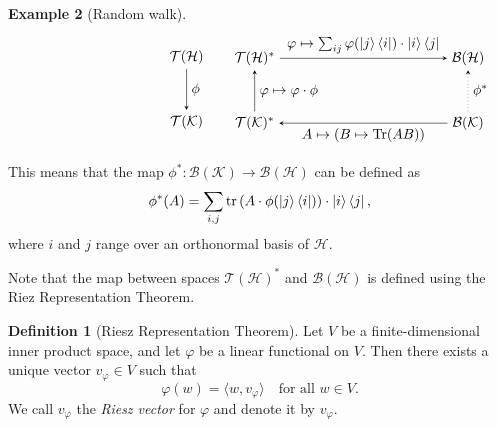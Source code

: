 \documentclass[10pt,a4paper]{amsart}
\theoremstyle{definition}
\newtheorem{definition}{Definition}[section]
\theoremstyle{definition}
\newtheorem{example}[definition]{Example}
\theoremstyle{definition}
\theoremstyle{definition}
\theoremstyle{definition}
\theoremstyle{definition}
\begin{document}
\begin{example}[Random walk]
\[
\begin{minipage}{0.45\textwidth}
\centering
\begin{tikzpicture}
  \matrix (m) [matrix of math nodes,row sep=3em,column sep=2em,minimum width=1em]
  { 
    \mathcal{T}(\mathcal{H}) \\
     \mathcal{T}(\mathcal{K})  \\
  };
  \path[-stealth]
    (m-1-1) edge  node [right] {$\phi$} (m-2-1);
\end{tikzpicture}
\end{minipage}
\hspace{-50pt}
\begin{minipage}{0.45\textwidth}
\centering
\begin{tikzpicture}
  \matrix (m) [matrix of math nodes,row sep=3em,column sep=12em,minimum width=1em]
  {
  \mathcal{T}(\mathcal{H})^*&  \mathcal{B}(\mathcal{H})  \\
   \mathcal{T}(\mathcal{K})^* &  \mathcal{B}(\mathcal{K}) \\
  };
  \path[-stealth]
    (m-1-1) edge  node [above] {$\varphi \mapsto \sum_{ij} \varphi(\ket{j}\bra{i}) \cdot \ket{i} \bra{j}  $} (m-1-2)
    (m-2-2) edge [dotted]  node [right] {$\phi^*$} (m-1-2)
    (m-2-2) edge  node [below] {$ A \mapsto (B \mapsto \tr(AB)) $} (m-2-1)
    (m-2-1) edge  node [right] {$ \varphi \mapsto \varphi \cdot \phi $} (m-1-1)
    ;
\end{tikzpicture}
\end{minipage}
\]


This means that the map $\phi^* : \mathcal{B}(\mathcal{K}) \to \mathcal{B}(\mathcal{H})$ can be defined as
\[
\phi^*(A) = \sum_{i,j} \operatorname{tr}\left(A \cdot \phi(\ket{j}\bra{i})\right) \cdot \ket{i}\bra{j},
\]
where \( i \) and \( j \) range over an orthonormal basis of \( \mathcal{H} \). 

Note that the map between spaces $\mathcal{T}(\mathcal{H})^*$ and $\mathcal{B}(\mathcal{H})$ is defined using the Riez Representation Theorem.

\begin{definition} [Riesz Representation Theorem]
Let $V$ be a finite-dimensional inner product space, and let $\varphi$ be a linear functional on $V$. Then there exists a unique vector $v_\varphi \in V$ such that
$$
\varphi(w) = \langle w, v_\varphi \rangle \quad \text{for all } w \in V.
$$
We call $v_\varphi$ the \emph{Riesz vector} for $\varphi$ and denote it by $v_\varphi$.\\
\end{definition}


\end{example}
\end{document}
